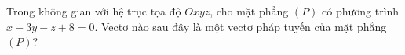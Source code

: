 \begin{ex}
Trong không gian với hệ trục tọa độ $Oxyz$, cho mặt phẳng $(P)$ có phương trình $x-3y-z+8=0$. Vectơ nào sau đây là một vectơ pháp tuyến của mặt phẳng $(P)$?
\end{ex}
